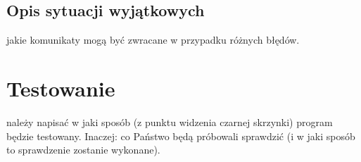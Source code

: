 \documentclass[10pt,oneside]{article}
\begin{document}
\subsection{Opis sytuacji wyjątkowych}
jakie komunikaty mogą być zwracane w przypadku różnych błędów.

\section{Testowanie}
należy napisać w jaki sposób (z punktu widzenia czarnej skrzynki) program będzie testowany. Inaczej: co Państwo będą próbowali sprawdzić (i w jaki sposób to sprawdzenie zostanie wykonane).
\end{document}
